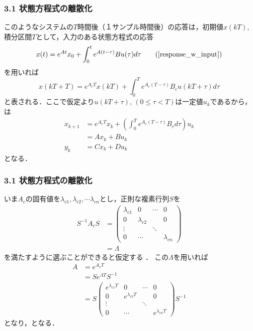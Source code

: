 \begin{frame}[t]
\frametitle{3.1 状態方程式の離散化}
このようなシステムの$T$時間後（１サンプル時間後）の応答は，初期値$x(kT)$,積分区間$T$として，入力のある状態方程式の応答
\begin{align}
  x(t) = e^{At} x_0 + \int_0^t e^{A(t-\tau)} B u (\tau) d \tau
  \tag{\ref{response_w_input}}
\end{align}
を用いれば
\begin{equation}
 x(kT+T) = e^{A_c T} x(kT) 
  + \int_0^T e^{A_c(T - \tau)}B_c u (kT + \tau) d \tau
\end{equation}
と表される．ここで仮定より$u(kT+\tau)$, $(0\leq\tau<T)$は一定値$u_k$であるから，
は
\begin{align}
 x_{k+1} &= e^{A_cT} x_k 
  + \left( \int_0^T e^{A_c(T-\tau)} B_c d \tau \right) u_k \nonumber \\
 &= A x_k + B u_k \\
 y_k &= C x_k + D u_k 
\end{align}
となる．
\end{frame}

\begin{frame}[t]
\frametitle{3.1 状態方程式の離散化}
いま$A_c$の固有値を$\lambda_{c1}, \lambda_{c2},
\cdots \lambda_{cn}$とし，正則な複素行列$S$を
\begin{align}
 S^{-1} A_c S 
  &=
  \left(\begin{array}{cccc}
         \lambda_{c1} & 0            & \cdots & 0 \\
	 0            & \lambda_{c2} &        & 0 \\
	 \vdots       &              & \ddots & \\
	 0            & \cdots       &        & \lambda_{cn} 
	\end{array}\right) \nonumber \\
 &= \Lambda
\end{align}
を満たすように選ぶことができると仮定する%
．
この$\Lambda$を用いれば
\begin{align}
 A &=  e^{A_cT} \nonumber \\
 &= S e^{\Lambda T} S^{-1} \nonumber \\
 &=
  S \left(\begin{array}{cccc}
           e^{\lambda_{c1} T} & 0                  & \cdots & 0 \\
	   0                  & e^{\lambda_{c2} T} &        & 0 \\
	   \vdots             &                    & \ddots & \\
	   0                  & \cdots             & & e^{\lambda_{cn} T}
	  \end{array}\right)
  S^{-1}
\end{align}
となり，となる．
\end{frame}


